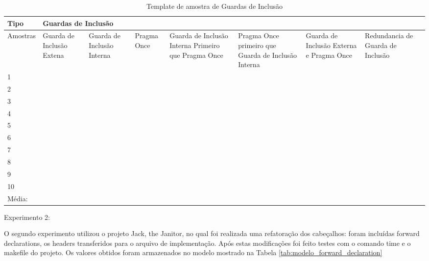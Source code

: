\begin{table}[h]
\centering
\caption{Template de amostra de Guardas de Inclusão}
\label{tab:modelo_guards}
\begin{tabular}{|p{1.5cm}|p{1.5cm}|p{1.5cm}|p{1.5cm}|p{1.5cm}|p{1.5cm}|p{1.5cm}|p{2cm}|}
\hline
Tipo & \multicolumn{7}{l|}{Guardas de Inclusão} \\ \hline
Amostras & Guarda de Inclusão Extena & Guarda de Inclusão Interna &
 Pragma Once & Guarda de Inclusão Interna Primeiro que Pragma Once &
 Pragma Once primeiro que Guarda de Inclusão Interna & Guarda de Inclusão
 Externa e Pragma Once & Redundancia de Guarda de Inclusão \\ \hline
1 &  &  &  &  &  &  &  \\ \hline
2 &  &  &  &  &  &  &  \\ \hline
3 &  &  &  &  &  &  &  \\ \hline
4 &  &  &  &  &  &  &  \\ \hline
5 &  &  &  &  &  &  &  \\ \hline
6 &  &  &  &  &  &  &  \\ \hline
7 &  &  &  &  &  &  &  \\ \hline
8 &  &  &  &  &  &  &  \\ \hline
9 &  &  &  &  &  &  &  \\ \hline
10 &  &  &  &  &  &  &  \\ \hline
Média: &  &  &  &  &  &  &  \\ \hline
\end{tabular}
\end{table}


Experimento 2:

O segundo experimento utilizou o projeto Jack, the Janitor, no qual foi
 realizada uma refatoração dos cabeçalhos: foram incluídas forward
 declarations, os headers  transferidos para o arquivo de
 implementação. Após estas modificações foi feito testes com o comando
 time e o makefile do projeto. Os valores obtidos foram armazenados no
 modelo mostrado na Tabela \ref{tab:modelo_forward_declaration}



